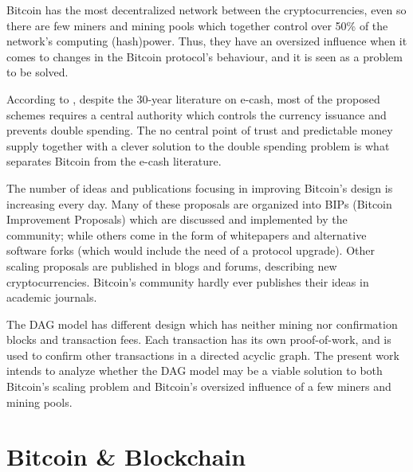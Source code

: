 Bitcoin has the most decentralized network between the cryptocurrencies, even so there are few miners and mining pools which together control over 50\% of the network’s computing (hash)power. Thus, they have an oversized influence when it comes to changes in the Bitcoin protocol's behaviour, and it is seen as a problem to be solved.

According to \citet{barber2012bitter}, despite the 30-year literature on e-cash, most of the proposed schemes requires a central authority which controls the currency issuance and prevents double spending. The no central point of trust and predictable money supply together with a clever solution to the double spending problem is what separates Bitcoin from the e-cash literature.

The number of ideas and publications focusing in improving Bitcoin's design is increasing every day. Many of these proposals are organized into BIPs (Bitcoin Improvement Proposals) which are discussed and implemented by the community; while others come in the form of whitepapers and alternative software forks (which would include the need of a protocol upgrade). Other scaling proposals are published in blogs and forums, describing new cryptocurrencies. Bitcoin's community hardly ever publishes their ideas in academic journals.



The DAG model \citep{dagdiscussion2014, tangle2016, dagcoin2015, sompolinsky2013, lewenberg2015, vorick2015} has different design which has neither mining nor confirmation blocks and transaction fees. Each transaction has its own proof-of-work, and is used to confirm other transactions in a directed acyclic graph. The present work intends to analyze whether the DAG model may be a viable solution to both Bitcoin's scaling problem and Bitcoin's oversized influence of a few miners and mining pools.

\chapter{Bitcoin \& Blockchain}

